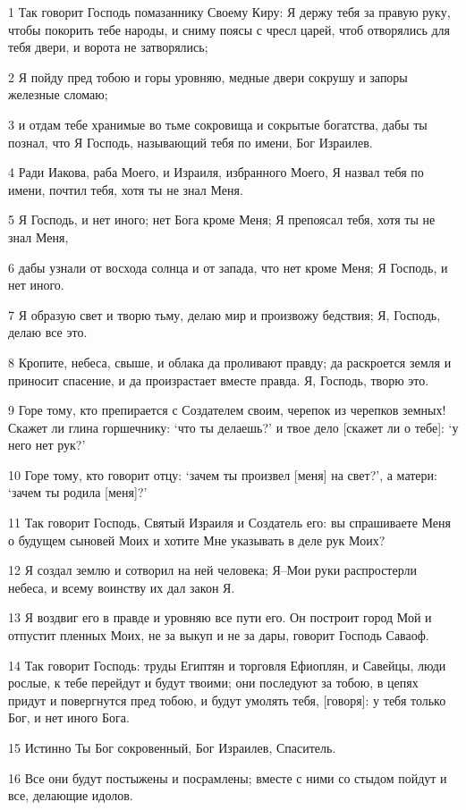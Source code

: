 \par 1 Так говорит Господь помазаннику Своему Киру: Я держу тебя за правую руку, чтобы покорить тебе народы, и сниму поясы с чресл царей, чтоб отворялись для тебя двери, и ворота не затворялись;
\par 2 Я пойду пред тобою и горы уровняю, медные двери сокрушу и запоры железные сломаю;
\par 3 и отдам тебе хранимые во тьме сокровища и сокрытые богатства, дабы ты познал, что Я Господь, называющий тебя по имени, Бог Израилев.
\par 4 Ради Иакова, раба Моего, и Израиля, избранного Моего, Я назвал тебя по имени, почтил тебя, хотя ты не знал Меня.
\par 5 Я Господь, и нет иного; нет Бога кроме Меня; Я препоясал тебя, хотя ты не знал Меня,
\par 6 дабы узнали от восхода солнца и от запада, что нет кроме Меня; Я Господь, и нет иного.
\par 7 Я образую свет и творю тьму, делаю мир и произвожу бедствия; Я, Господь, делаю все это.
\par 8 Кропите, небеса, свыше, и облака да проливают правду; да раскроется земля и приносит спасение, и да произрастает вместе правда. Я, Господь, творю это.
\par 9 Горе тому, кто препирается с Создателем своим, черепок из черепков земных! Скажет ли глина горшечнику: `что ты делаешь?' и твое дело [скажет ли о тебе]: `у него нет рук?'
\par 10 Горе тому, кто говорит отцу: `зачем ты произвел [меня] на свет?', а матери: `зачем ты родила [меня]?'
\par 11 Так говорит Господь, Святый Израиля и Создатель его: вы спрашиваете Меня о будущем сыновей Моих и хотите Мне указывать в деле рук Моих?
\par 12 Я создал землю и сотворил на ней человека; Я--Мои руки распростерли небеса, и всему воинству их дал закон Я.
\par 13 Я воздвиг его в правде и уровняю все пути его. Он построит город Мой и отпустит пленных Моих, не за выкуп и не за дары, говорит Господь Саваоф.
\par 14 Так говорит Господь: труды Египтян и торговля Ефиоплян, и Савейцы, люди рослые, к тебе перейдут и будут твоими; они последуют за тобою, в цепях придут и повергнутся пред тобою, и будут умолять тебя, [говоря]: у тебя только Бог, и нет иного Бога.
\par 15 Истинно Ты Бог сокровенный, Бог Израилев, Спаситель.
\par 16 Все они будут постыжены и посрамлены; вместе с ними со стыдом пойдут и все, делающие идолов.
